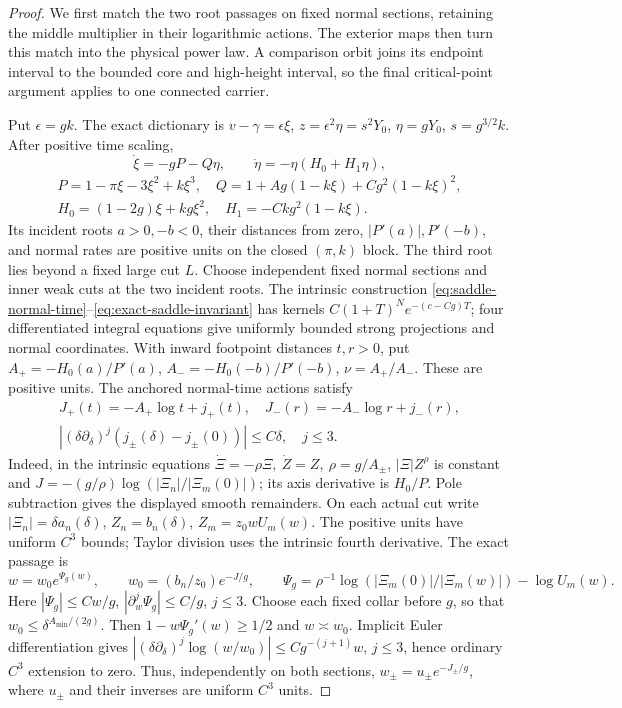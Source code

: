 \begin{proof}
We first match the two root passages on fixed normal sections, retaining
the middle multiplier in their logarithmic actions. The exterior maps
then turn this match into the physical power law. A comparison orbit
joins its endpoint interval to the bounded core and high-height interval,
so the final critical-point argument applies to one connected carrier.

Put \(\epsilon=gk\). The exact dictionary is
\(v-\gamma=\epsilon\xi\), \(z=\epsilon^2\eta=s^2Y_0\),
\(\eta=gY_0\), \(s=g^{3/2}k\). After positive time scaling,
\[
 \dot\xi=-gP-Q\eta,\qquad \dot\eta=-\eta(H_0+H_1\eta),
\]
\[
 \begin{gathered}
 P=1-\pi\xi-3\xi^2+k\xi^3,\quad
 Q=1+Ag(1-k\xi)+Cg^2(1-k\xi)^2,\\
 H_0=(1-2g)\xi+kg\xi^2,\quad H_1=-Ckg^2(1-k\xi).
 \end{gathered}
\]
Its incident roots \(a>0,-b<0\), their distances from zero,
\(|P'(a)|,P'(-b)\), and normal rates are positive units on the
closed \((\pi,k)\) block. The third root lies beyond a fixed large
cut \(L\). Choose independent fixed normal sections and inner weak
cuts at the two incident roots. The intrinsic construction
\eqref{eq:saddle-normal-time}--\eqref{eq:exact-saddle-invariant}
has kernels \(C(1+T)^Ne^{-(c-Cg)T}\); four differentiated integral
equations give uniformly bounded strong projections and normal coordinates.
With inward footpoint distances \(t,r>0\), put
\(A_+=-H_0(a)/P'(a)\), \(A_-=-H_0(-b)/P'(-b)\),
\(\nu=A_+/A_-\). These are positive units. The anchored normal-time
actions satisfy
\begin{equation}\label{deg:negative-gamma-actions}
 \begin{gathered}
 J_+(t)=-A_+\log t+j_+(t),\quad J_-(r)=-A_-\log r+j_-(r),\\
 |(\delta\partial_\delta)^j(j_\pm(\delta)-j_\pm(0))|\le C\delta,
 \quad j\le3.
 \end{gathered}
\end{equation}
Indeed, in the intrinsic equations
\(\dot\Xi=-\rho\Xi,\ \dot Z=Z,\ \rho=g/A_\pm\),
\(|\Xi|Z^\rho\) is constant and
\(J=-(g/\rho)\log(|\Xi_n|/|\Xi_m(0)|)\); its axis derivative
is \(H_0/P\). Pole subtraction gives the displayed smooth remainders.
On each actual cut write
\(|\Xi_n|=\delta a_n(\delta)\), \(Z_n=b_n(\delta)\),
\(Z_m=z_0wU_m(w)\). The positive units have uniform \(C^3\) bounds;
Taylor division uses the intrinsic fourth derivative. The exact passage is
\[
 w=w_0e^{\Psi_g(w)},\qquad
 w_0=(b_n/z_0)e^{-J/g},\qquad
 \Psi_g=\rho^{-1}\log(|\Xi_m(0)|/|\Xi_m(w)|)-\log U_m(w).
\]
Here \(|\Psi_g|\le Cw/g\), \(|\partial_w^j\Psi_g|\le C/g\),
\(j\le3\). Choose each fixed collar before \(g\), so that
\(w_0\le\delta^{A_{\min}/(2g)}\). Then
\(1-w\Psi_g'(w)\ge1/2\) and \(w\asymp w_0\). Implicit Euler
differentiation gives
\(|(\delta\partial_\delta)^j\log(w/w_0)|\le Cg^{-(j+1)}w\),
\(j\le3\), hence ordinary \(C^3\) extension to zero. Thus,
independently on both sections, \(w_\pm=u_\pm e^{-J_\pm/g}\),
where \(u_\pm\) and their inverses are uniform \(C^3\) units.


\end{proof}
